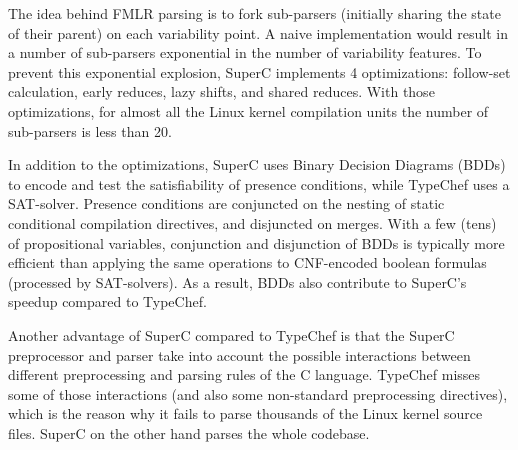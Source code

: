 \documentclass[11pt]{article}
\begin{document}
The idea behind FMLR parsing is to fork sub-parsers (initially sharing the state of their parent) on each variability point. A naive implementation would result in a number of sub-parsers exponential in the number of variability features. To prevent this exponential explosion, SuperC implements 4 optimizations: follow-set calculation, early reduces, lazy shifts, and shared reduces. With those optimizations, for almost all the Linux kernel compilation units the number of sub-parsers is less than 20.

In addition to the optimizations, SuperC uses Binary Decision Diagrams (BDDs) to encode and test the satisfiability of presence conditions, while TypeChef uses a SAT-solver. Presence conditions are conjuncted on the nesting of static conditional compilation directives, and disjuncted on merges. With a few (tens) of propositional variables, conjunction and disjunction of BDDs is typically more efficient than applying the same operations to CNF-encoded boolean formulas (processed by SAT-solvers). As a result, BDDs also contribute to SuperC's speedup compared to TypeChef.

Another advantage of SuperC compared to TypeChef is that the SuperC preprocessor and parser take into account the possible interactions between different preprocessing and parsing rules of the C language. TypeChef misses some of those interactions (and also some non-standard preprocessing directives), which is the reason why it fails to parse thousands of the Linux kernel source files. SuperC on the other hand parses the whole codebase.


 
\end{document}
